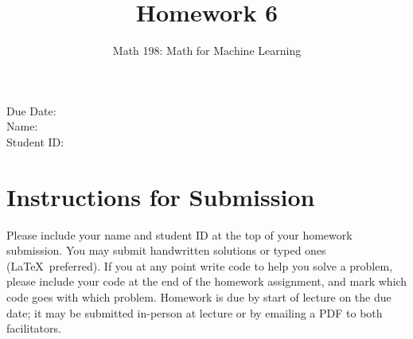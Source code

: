 \documentclass{article}
\title{Homework 6}
\author{Math 198: Math for Machine Learning}
\date{}
\begin{document}
\maketitle

\noindent
Due Date:  \\
Name: \\
Student ID:

\section*{Instructions for Submission}
Please include your name and student ID at the top of your homework submission. You may submit handwritten solutions or typed ones (\LaTeX\ preferred). If you at any point write code to help you solve a problem, please include your code at the end of the homework assignment, and mark which code goes with which problem. Homework is due by start of lecture on the due date; it may be submitted in-person at lecture or by emailing a PDF to both facilitators.
\end{document}
